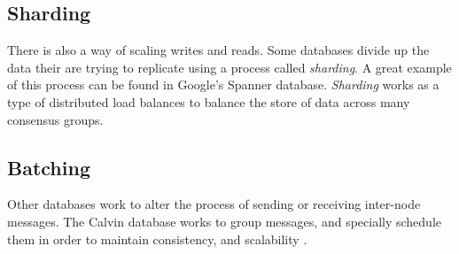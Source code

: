 \subsection{Sharding}

There is also a way of scaling writes and reads. Some databases divide up the data their are trying to replicate using a process called \textit{sharding}. A great example of this process can be found in Google's Spanner database\cite{Spanner}. \textit{Sharding} works as a type of distributed load balances to balance the store of data across many consensus groups.

\subsection{Batching}

Other databases work to alter the process of sending or receiving inter-node messages. The Calvin database works to group messages, and specially schedule them in order to maintain consistency, and scalability \cite{Calvin}.